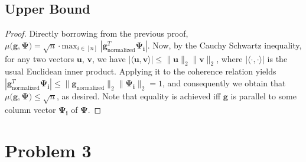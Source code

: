 \documentclass[a4paper,11pt]{article}
\numberwithin{definition}{section}
\numberwithin{mytheorem}{subsection}
\begin{document}
\subsection{Upper Bound}
\begin{proof}
Directly borrowing from the previous proof, $\mu(\boldsymbol{g, \Psi)} = \sqrt{n}\cdot\mathrm{max}_{i\in[n]}\;|\boldsymbol{g}_{\mathrm{normalized}}^T\boldsymbol{\Psi_i}|$. Now, by the Cauchy Schwartz inequality, for any two vectors $\mathbf{u}$, $\mathbf{v}$, we have $|\langle \mathbf{u}, \mathbf{v}\rangle|\leq \lVert \mathbf{u}\rVert_2\lVert \mathbf{v}\rVert_2$, where $|\langle \cdot, \cdot\rangle|$ is the usual Euclidean inner product. Applying it to the coherence relation yields $|\boldsymbol{g}_{\mathrm{normalized}}^T\boldsymbol{\Psi_i}| \leq \lVert \boldsymbol{g}_{\mathrm{normalized}}\rVert_2\lVert \boldsymbol{\Psi_i}\rVert_2 = 1$, and consequently we obtain that $\mu(\boldsymbol{g, \Psi)} \leq \sqrt{n}$, as desired. Note that equality is achieved iff $\boldsymbol{g}$ is parallel to some column vector $\boldsymbol{\Psi_i}$ of $\boldsymbol{\Psi}$.
\end{proof}
\section{Problem 3}
\end{document}
